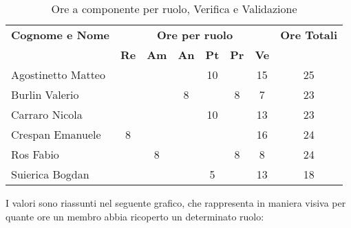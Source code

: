 \begin{table}[h]
\centering
\begin{tabular}{|l|c|c|c|c|c|c|c|}
	\toprule
	\textbf{Cognome e Nome} & \multicolumn{6}{c}{\textbf{Ore per ruolo}} & \textbf{Ore Totali} \\
	& \textbf{Re} & \textbf{Am} & \textbf{An} & \textbf{Pt} & \textbf{Pr} & \textbf{Ve} & \\
		
	\midrule
	Agostinetto Matteo & & & & 10 & & 15 & 25 \\
	Burlin Valerio & & & 8 & & 8 & 7 & 23 \\ 
	Carraro Nicola & & & & 10 & & 13 & 23 \\
	Crespan Emanuele & 8 & & & & & 16 & 24 \\
	Ros Fabio & & 8 & & & 8 & 8 & 24 \\
	Suierica Bogdan & & & & 5 & & 13 & 18 \\
		
	\bottomrule
\end{tabular}
\caption{Ore a componente per ruolo, Verifica e Validazione}
\end{table}

\noindent I valori sono riassunti nel seguente grafico, che rappresenta in maniera visiva per quante ore un membro abbia ricoperto un determinato ruolo:

